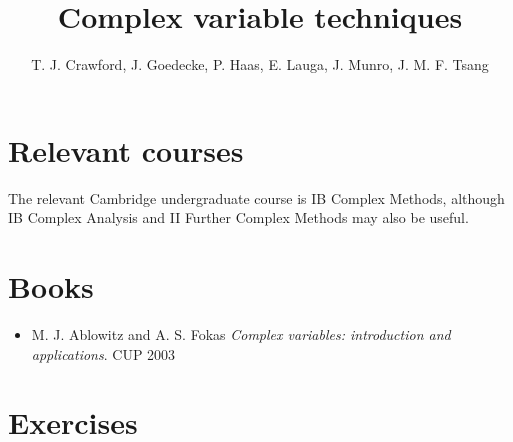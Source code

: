 \documentclass{article}
\title{Complex variable techniques}
\author{T. J. Crawford, J. Goedecke, P. Haas, E. Lauga, J. Munro, J. M. F. Tsang}
\begin{document}
\maketitle

\section{Relevant courses}

The relevant Cambridge undergraduate course is IB Complex Methods, although IB
Complex Analysis and II Further Complex Methods may also be useful.

\section{Books}

\begin{itemize}
    \item M. J. Ablowitz and A. S. Fokas \textit{Complex variables: introduction and
applications}. CUP 2003
\end{itemize}

\section{Exercises}
\end{document}
